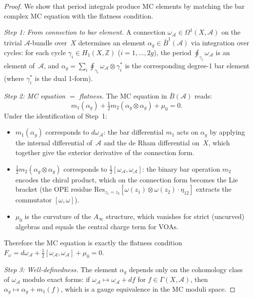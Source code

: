 \begin{proof}
We show that period integrals produce MC elements by matching the bar complex MC equation with the flatness condition.

\emph{Step 1: From connection to bar element.}
A connection $\omega_\mathcal{A} \in \Omega^1(X, \mathcal{A})$ on the trivial $\mathcal{A}$-bundle over~$X$ determines an element $\alpha_g \in \bar{B}^1(\mathcal{A})$ via integration over cycles: for each cycle $\gamma_i \in H_1(X, \mathbb{Z})$ ($i = 1, \ldots, 2g$), the period $\oint_{\gamma_i} \omega_\mathcal{A}$ is an element of~$\mathcal{A}$, and $\alpha_g = \sum_i \oint_{\gamma_i} \omega_\mathcal{A} \otimes \gamma_i^*$ is the corresponding degree-1 bar element (where $\gamma_i^*$ is the dual 1-form).

\emph{Step 2: MC equation $=$ flatness.}
The MC equation in $\bar{B}(\mathcal{A})$ reads:
\[
m_1(\alpha_g) + \tfrac{1}{2} m_2(\alpha_g \otimes \alpha_g) + \mu_0 = 0.
\]
Under the identification of Step~1:
\begin{itemize}
\item $m_1(\alpha_g)$ corresponds to $d\omega_\mathcal{A}$: the bar differential $m_1$ acts on $\alpha_g$ by applying the internal differential of~$\mathcal{A}$ and the de Rham differential on~$X$, which together give the exterior derivative of the connection form.
\item $\tfrac{1}{2} m_2(\alpha_g \otimes \alpha_g)$ corresponds to $\tfrac{1}{2}[\omega_\mathcal{A}, \omega_\mathcal{A}]$: the binary bar operation $m_2$ encodes the chiral product, which on the connection form becomes the Lie bracket (the OPE residue $\mathrm{Res}_{z_1=z_2}[\omega(z_1) \otimes \omega(z_2) \cdot \eta_{12}]$ extracts the commutator $[\omega, \omega]$).
\item $\mu_0$ is the curvature of the $A_\infty$ structure, which vanishes for strict (uncurved) algebras and equals the central charge term for VOAs.
\end{itemize}
Therefore the MC equation is exactly the flatness condition $F_\omega = d\omega_\mathcal{A} + \tfrac{1}{2}[\omega_\mathcal{A}, \omega_\mathcal{A}] + \mu_0 = 0$.

\emph{Step 3: Well-definedness.}
The element $\alpha_g$ depends only on the cohomology class of $\omega_\mathcal{A}$ modulo exact forms: if $\omega_\mathcal{A} \mapsto \omega_\mathcal{A} + df$ for $f \in \Gamma(X, \mathcal{A})$, then $\alpha_g \mapsto \alpha_g + m_1(f)$, which is a gauge equivalence in the MC moduli space.
\end{proof}

